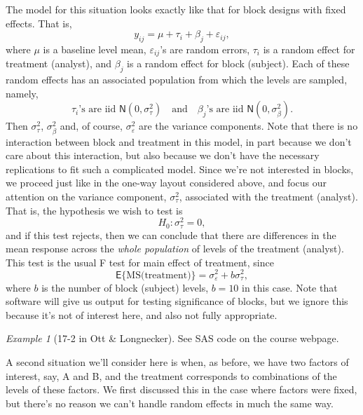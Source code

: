 \documentclass[a4paper, 12pt]{article}
\theoremstyle{plain}
\theoremstyle{definition}
\theoremstyle{remark}
\newtheorem*{example}{Example}
\newcommand{\E}{\mathsf{E}}
\newcommand{\eps}{\varepsilon}
\newcommand{\nm}{\mathsf{N}}
\begin{document}
The model for this situation looks exactly like that for block designs with fixed effects.  That is, 
\[ y_{ij} = \mu + \tau_i + \beta_j + \eps_{ij}, \]
where $\mu$ is a baseline level mean, $\eps_{ij}$'s are random errors, $\tau_i$ is a random effect for treatment (analyst), and $\beta_j$ is a random effect for block (subject).  Each of these random effects has an associated population from which the levels are sampled, namely, 
\[ \text{$\tau_i$'s are iid $\nm(0, \sigma_\tau^2)$} \quad \text{and} \quad \text{$\beta_j$'s are iid $\nm(0, \sigma_\beta^2)$}. \]
Then $\sigma_\tau^2$, $\sigma_\beta^2$ and, of course, $\sigma_\eps^2$ are the variance components.  Note that there is no interaction between block and treatment in this model, in part because we don't care about this interaction, but also because we don't have the necessary replications to fit such a complicated model.  Since we're not interested in blocks, we proceed just like in the one-way layout considered above, and focus our attention on the variance component, $\sigma_\tau^2$, associated with the treatment (analyst).  That is, the hypothesis we wish to test is 
\[ H_0: \sigma_\tau^2 = 0, \]
and if this test rejects, then we can conclude that there are differences in the mean response across the {\em whole population} of levels of the treatment (analyst).  This test is the usual F test for main effect of treatment, since 
\[ \E\{\text{MS(treatment)}\} = \sigma_\eps^2 + b \sigma_\tau^2, \]
where $b$ is the number of block (subject) levels, $b=10$ in this case.  Note that software will give us output for testing significance of blocks, but we ignore this because it's not of interest here, and also not fully appropriate.  

\begin{example}[17-2 in Ott \& Longnecker]
See SAS code on the course webpage.
\end{example}

A second situation we'll consider here is when, as before, we have two factors of interest, say, A and B, and the treatment corresponds to combinations of the levels of these factors.  We first discussed this in the case where factors were fixed, but there's no reason we can't handle random effects in much the same way.  
\end{document}
